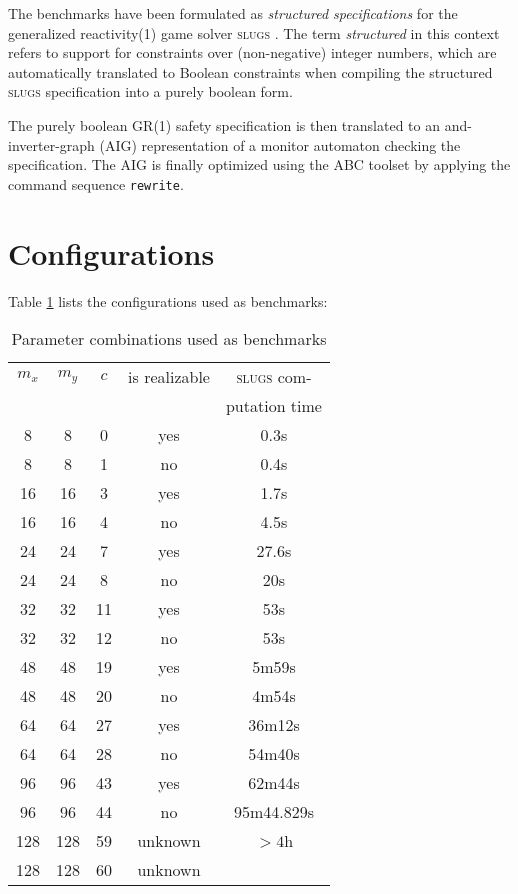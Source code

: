 \documentclass[a4paper,conference,10pt]{IEEEtran}
\begin{document}
The benchmarks have been formulated as \emph{structured specifications} for the generalized reactivity(1) game solver \textsc{slugs} \cite{SlugsReference}. The term \emph{structured} in this context refers to support for constraints over (non-negative) integer numbers, which are automatically translated to Boolean constraints when compiling the structured \textsc{slugs} specification into a purely boolean form.

The purely boolean GR(1) safety specification is then translated to an and-inverter-graph (AIG) representation of a monitor automaton checking the specification. The AIG is finally optimized using the ABC toolset \cite{ABCTool} by applying the command sequence \texttt{rewrite}.


\section{Configurations}

Table \ref{tab:benchmarks} lists the configurations used as benchmarks:

\begin{table}[b]
\normalsize
\begin{center}
\begin{tabular}{c|c|c||c|c}
$m_x$ & $m_y$ & $c$ & is realizable & \textsc{slugs} com- \\ & & & & putation time\\ \hline \hline
8 & 8 & 0 & yes & 0.3s \\ \hline
8 & 8 & 1 & no & 0.4s \\ \hline
16 & 16 & 3 & yes & 1.7s \\ \hline
16 & 16 & 4 & no & 4.5s \\ \hline
24 & 24 & 7 & yes & 27.6s\\ \hline
24 & 24 & 8 & no & 20s \\ \hline
32 & 32 & 11 & yes & 53s \\ \hline
32 & 32 & 12 & no & 53s \\ \hline
48 & 48 & 19 & yes & 5m59s \\ \hline
48 & 48 & 20 & no & 4m54s \\ \hline
64 & 64 & 27 & yes & 36m12s   \\ \hline
64 & 64 & 28 & no & 54m40s   \\ \hline
96 & 96 & 43 & yes & 62m44s  \\ \hline
96 & 96 & 44 & no & 95m44.829s  \\ \hline
128 & 128 & 59 & unknown & $> 4$h   \\ \hline
128 & 128 & 60 & unknown &    \\ 

\end{tabular}
\end{center}
\caption{Parameter combinations used as benchmarks}
\label{tab:benchmarks}
\end{table}
\end{document}
